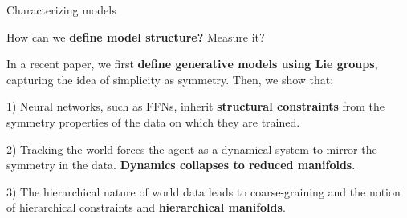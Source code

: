   
\begin{frame}[label=st] {Characterizing models \cite{ruffiniStructuredDynamicsAlgorithmic2023}}
    
     How can we \textbf{define model structure?} Measure it? \vfill
     
     In a recent paper\cite{ruffiniStructuredDynamicsAlgorithmic2023}, we first \textbf{define generative models using Lie groups}, capturing the idea of simplicity as symmetry. Then, we show that:
    \vfill
   
  1)  Neural networks, such as FFNs, inherit \textbf{structural constraints} from the symmetry properties of the data on which they are trained.\vfill
    
    
    2) Tracking the world forces the agent as a dynamical system to mirror the symmetry in the data.\textbf{ Dynamics collapses to reduced manifolds}. \vfill
    
    3) The hierarchical nature of world data leads to coarse-graining and the notion of hierarchical constraints and \textbf{hierarchical manifolds}.\vfill
    
\end{frame}


  
  
  
   
